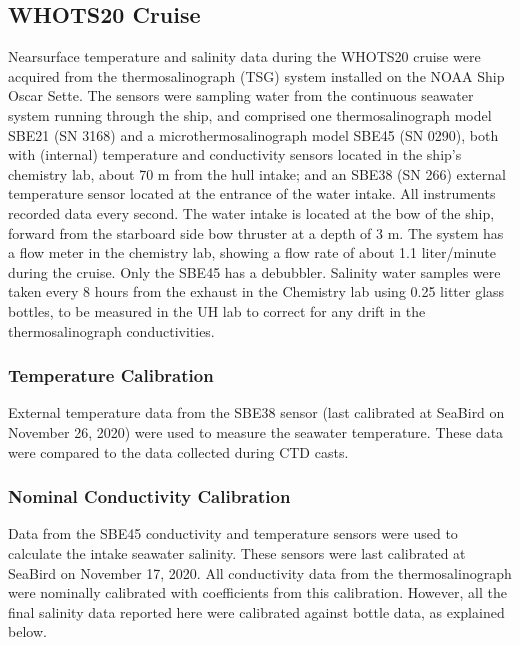 \documentclass[a4paper,10pt,english,openany,oneside]{sphinxmanual}
\begin{document}
\subsection{WHOTS\sphinxhyphen{}20 Cruise}
\label{\detokenize{4_section:whots-20-cruise}}
\sphinxAtStartPar
Near\sphinxhyphen{}surface temperature and salinity data during the WHOTS\sphinxhyphen{}20 cruise were
acquired from the thermosalinograph (TSG) system installed on the NOAA Ship
Oscar Sette. The sensors were sampling water from the continuous seawater
system running through the ship, and comprised one thermosalinograph model
SBE\sphinxhyphen{}21 (SN 3168) and a micro\sphinxhyphen{}thermosalinograph model SBE\sphinxhyphen{}45 (SN 0290), both
with (internal) temperature and conductivity sensors located in the ship’s
chemistry lab, about 70 m from the hull intake; and an SBE\sphinxhyphen{}38 (SN 266)
external temperature sensor located at the entrance of the water intake. All
instruments recorded data every second. The water intake is located at the bow
of the ship, forward from the starboard side bow thruster at a depth of 3 m.
The system has a flow meter in the chemistry lab, showing a flow rate of about
1.1 liter/minute during the cruise. Only the SBE\sphinxhyphen{}45 has a debubbler. Salinity
water samples were taken every 8 hours from the exhaust in the Chemistry lab
using 0.25 litter glass bottles, to be measured in the UH lab to correct for
any drift in the thermosalinograph conductivities.


\subsubsection{Temperature Calibration}
\label{\detokenize{4_section:id7}}
\sphinxAtStartPar
External temperature data from the SBE\sphinxhyphen{}38 sensor (last calibrated at Sea\sphinxhyphen{}Bird
on November 26, 2020) were used to measure the seawater temperature. These
data were compared to the data collected during CTD casts.


\subsubsection{Nominal Conductivity Calibration}
\label{\detokenize{4_section:id8}}
\sphinxAtStartPar
Data from the SBE\sphinxhyphen{}45 conductivity and temperature sensors were used to
calculate the intake seawater salinity. These sensors were last calibrated at
Sea\sphinxhyphen{}Bird on November 17, 2020. All conductivity data from the thermosalinograph
were nominally calibrated with coefficients from this calibration. However, all
the final salinity data reported here were calibrated against bottle data, as
explained below.
\end{document}
